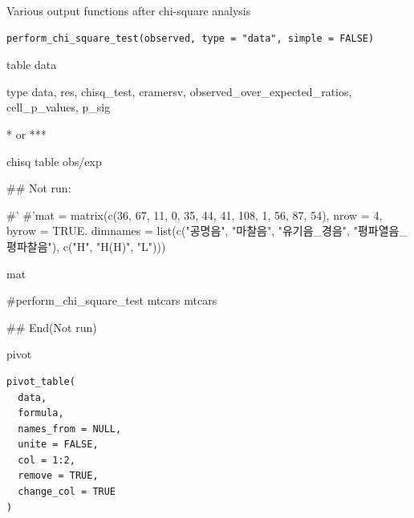 \documentclass[a4paper]{book}
\begin{document}
%
\begin{Description}
Various output functions after chi-square analysis
\end{Description}
%
\begin{Usage}
\begin{verbatim}
perform_chi_square_test(observed, type = "data", simple = FALSE)
\end{verbatim}
\end{Usage}
%
\begin{Arguments}
\begin{ldescription}
\item[\code{observed}] table data

\item[\code{type}] type data, res, chisq\_test, cramersv, observed\_over\_expected\_ratios, cell\_p\_values, p\_sig

\item[\code{simple}] * or ***
\end{ldescription}
\end{Arguments}
%
\begin{Value}
chisq table obs/exp
\end{Value}
%
\begin{Examples}
\begin{ExampleCode}

\#\# Not run: 

#' #'mat = matrix(c(36, 67, 11,
          0, 35, 44,
         41, 108, 1,
          56, 87, 54),
           nrow = 4, byrow = TRUE.
   dimnames = list(c("공명음", "마찰음",
     "유기음_경음", "평파열음_평파찰음"),  c("H", "H(H)", "L")))

 mat %

 #perform_chi_square_test
mtcars%
mtcars%

## End(Not run)

\end{ExampleCode}
\end{Examples}
%
\begin{Description}
pivot
\end{Description}
%
\begin{Usage}
\begin{verbatim}
pivot_table(
  data,
  formula,
  names_from = NULL,
  unite = FALSE,
  col = 1:2,
  remove = TRUE,
  change_col = TRUE
)
\end{verbatim}
\end{Usage}
\end{document}
